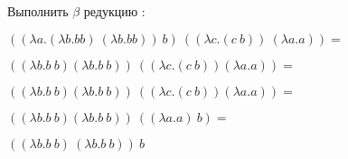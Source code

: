 \documentclass[12pt]{article}
\begin{document}
Выполнить $\beta$ редукцию : \newline 

$ ((\lambda a.(\lambda b.b b)\: (\lambda b.b b)) \:b) \:((\lambda c.(c\: b))\: (\lambda a.a)) = $ \newline 

$ ((\lambda b.b\:b) (\lambda b.b\:b))\: ((\lambda c.(c\:b)) (\lambda a.a)) = $ \newline 

$ ((\lambda b.b\:b) (\lambda b.b\:b)) \:((\lambda c.(c\:b)) (\lambda a.a)) = $ \newline 

$ ((\lambda b.b\:b) (\lambda b.b\:b))\: ((\lambda a.a)\:b) = $ \newline 

$ ((\lambda b.b\:b)\: (\lambda b.b\:b)) \: b $ \newline 
\end{document}
